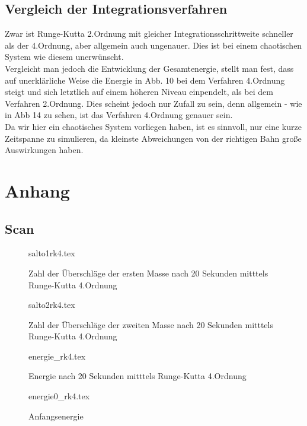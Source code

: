 \documentclass[12pt,a4paper,titlepage,headinclude,bibtotoc]{scrartcl}
\begin{document}
\subsection{Vergleich der Integrationsverfahren}
Zwar ist Runge-Kutta 2.Ordnung mit gleicher Integrationsschrittweite schneller als der 4.Ordnung, aber allgemein auch ungenauer. 
Dies ist bei einem chaotischen System wie diesem unerwünscht.\\
Vergleicht man jedoch die Entwicklung der Gesamtenergie, stellt man fest, dass auf unerklärliche Weise die Energie in Abb. 10 bei dem Verfahren 4.Ordnung steigt und sich letztlich auf einem höheren Niveau einpendelt, als bei dem Verfahren 2.Ordnung.
Dies scheint jedoch nur Zufall zu sein, denn allgemein - wie in Abb 14 zu sehen, ist das Verfahren 4.Ordnung genauer sein.\\ 
Da wir hier ein chaotisches System vorliegen haben, ist es sinnvoll, nur eine kurze Zeitspanne zu simulieren, da kleinste Abweichungen von der richtigen Bahn große Auswirkungen haben.

\section{Anhang}
\subsection{Scan}
\begin{figure}[!htb]
	\centering
	{salto1rk4.tex}
	\caption{Zahl der Überschläge der ersten Masse nach 20 Sekunden mitttels Runge-Kutta 4.Ordnung}
\end{figure}

\begin{figure}[!htb]
	\centering
	{salto2rk4.tex}
	\caption{Zahl der Überschläge der zweiten Masse nach 20 Sekunden mitttels Runge-Kutta 4.Ordnung}
\end{figure}

\begin{figure}[!htb]
	\centering
	{energie_rk4.tex}
	\caption{Energie nach 20 Sekunden mitttels Runge-Kutta 4.Ordnung}
\end{figure}

\begin{figure}[!htb]
	\centering
	{energie0_rk4.tex}
	\caption{Anfangsenergie}
\end{figure}
\newpage
\end{document}
